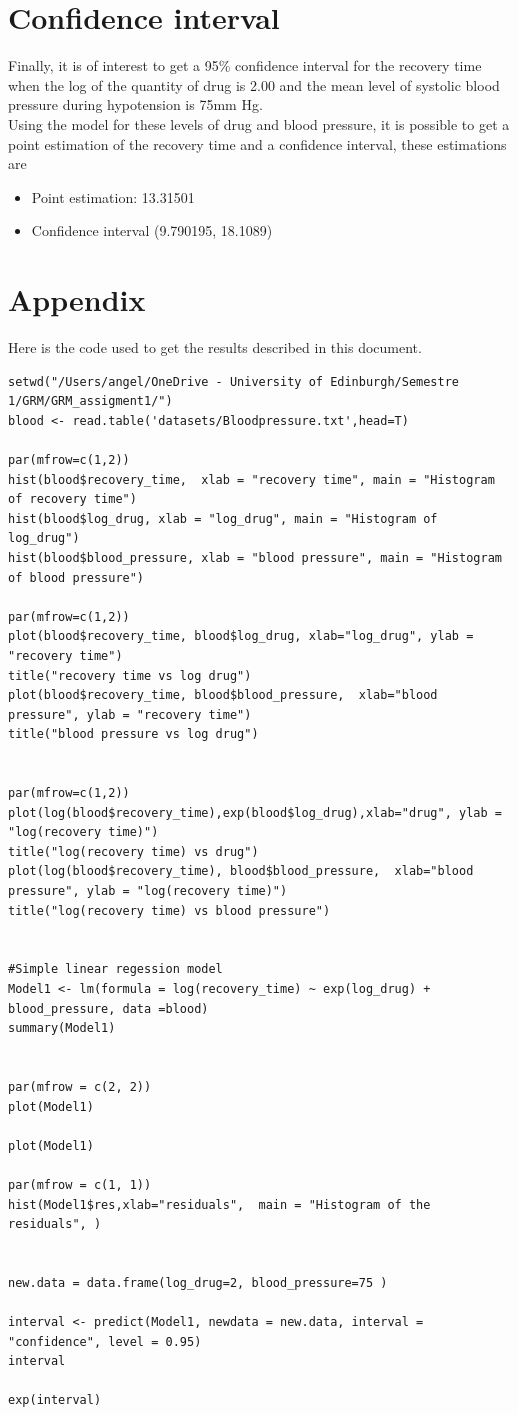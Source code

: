 \documentclass{article}
\begin{document}
\section{Confidence interval}
Finally, it is of interest to get a 95\% confidence interval for the recovery time when the  log of the quantity of drug is 2.00 and the mean level of systolic blood pressure during hypotension is 75mm Hg.
\\
Using the model for these levels of drug and blood pressure, it is possible to get a point estimation of the recovery time and a confidence interval, these estimations are

\begin{itemize}
    \item Point estimation: 13.31501
    \item Confidence interval (9.790195, 18.1089)
\end{itemize}

\newpage
\section{Appendix}

Here is the code used to get the results described in this document. 

\begin{verbatim}setwd("/Users/angel/OneDrive - University of Edinburgh/Semestre 1/GRM/GRM_assigment1/")
blood <- read.table('datasets/Bloodpressure.txt',head=T)

par(mfrow=c(1,2))
hist(blood$recovery_time,  xlab = "recovery time", main = "Histogram of recovery time")
hist(blood$log_drug, xlab = "log_drug", main = "Histogram of log_drug")
hist(blood$blood_pressure, xlab = "blood pressure", main = "Histogram of blood pressure")

par(mfrow=c(1,2))
plot(blood$recovery_time, blood$log_drug, xlab="log_drug", ylab = "recovery time")
title("recovery time vs log drug")
plot(blood$recovery_time, blood$blood_pressure,  xlab="blood pressure", ylab = "recovery time")
title("blood pressure vs log drug")


par(mfrow=c(1,2))
plot(log(blood$recovery_time),exp(blood$log_drug),xlab="drug", ylab = "log(recovery time)")
title("log(recovery time) vs drug")
plot(log(blood$recovery_time), blood$blood_pressure,  xlab="blood pressure", ylab = "log(recovery time)")
title("log(recovery time) vs blood pressure")


#Simple linear regession model 
Model1 <- lm(formula = log(recovery_time) ~ exp(log_drug) + blood_pressure, data =blood)
summary(Model1)


par(mfrow = c(2, 2))
plot(Model1)

plot(Model1)

par(mfrow = c(1, 1))
hist(Model1$res,xlab="residuals",  main = "Histogram of the residuals", )


new.data = data.frame(log_drug=2, blood_pressure=75 )

interval <- predict(Model1, newdata = new.data, interval = "confidence", level = 0.95)
interval

exp(interval)
\end{verbatim}
\end{document}
